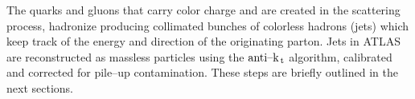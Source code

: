 The quarks and gluons that carry color charge and are created in the scattering
process, hadronize producing collimated bunches of colorless hadrons (jets)
which keep track of the energy and direction of the originating parton. Jets in
ATLAS are reconstructed as massless particles using the \emph{$\text{anti--k}_\mathrm{\, t}$}
algorithm, calibrated and corrected for pile--up contamination. These steps are
briefly outlined in the next sections.
